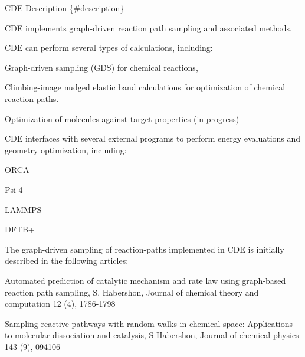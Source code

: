 C\+DE Description \{\#description\}

C\+DE implements graph-\/driven reaction path sampling and associated methods.

C\+DE can perform several types of calculations, including\+:
\begin{DoxyItemize}
\item Graph-\/driven sampling (G\+DS) for chemical reactions,
\item Climbing-\/image nudged elastic band calculations for optimization of chemical reaction paths.
\item Optimization of molecules against target properties (in progress)
\end{DoxyItemize}

C\+DE interfaces with several external programs to perform energy evaluations and geometry optimization, including\+:
\begin{DoxyItemize}
\item O\+R\+CA
\item Psi-\/4
\item L\+A\+M\+M\+PS
\item D\+F\+T\+B+
\end{DoxyItemize}

The graph-\/driven sampling of reaction-\/paths implemented in C\+DE is initially described in the following articles\+:
\begin{DoxyItemize}
\item Automated prediction of catalytic mechanism and rate law using graph-\/based reaction path sampling, S. Habershon, Journal of chemical theory and computation 12 (4), 1786-\/1798
\end{DoxyItemize}

Sampling reactive pathways with random walks in chemical space\+: Applications to molecular dissociation and catalysis, S Habershon, Journal of chemical physics 143 (9), 094106 